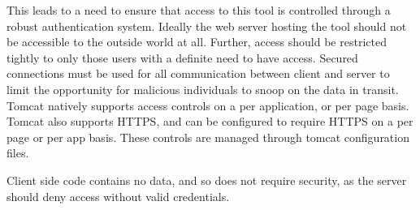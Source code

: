 This leads to a need to ensure that access to this tool is controlled through a robust authentication system. Ideally the web server hosting the tool should not be accessible to the outside world at all. Further, access should be restricted tightly to only those users with a definite need to have access. Secured connections must be used for all communication between client and server to limit the opportunity for malicious individuals to snoop on the data in transit. Tomcat natively supports access controls on a per application, or per page basis. Tomcat also supports HTTPS, and can be configured to require HTTPS on a per page or per app basis. These controls are managed through tomcat configuration files. 

Client side code contains no data, and so does not require security, as the server should deny access without valid credentials.